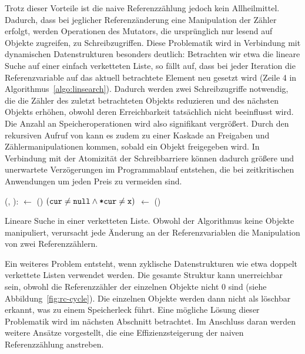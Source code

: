 Trotz dieser Vorteile ist die naive Referenzzählung jedoch kein Allheilmittel.
Dadurch, dass bei jeglicher Referenzänderung eine Manipulation der Zähler erfolgt, werden Operationen des Mutators, die ursprünglich nur lesend auf Objekte zugreifen, zu Schreibzugriffen.
Diese Problematik wird in Verbindung mit dynamischen Datenstrukturen besonders deutlich:
Betrachten wir etwa die lineare Suche auf einer einfach verketteten Liste, so fällt auf, dass bei jeder Iteration die Referenzvariable auf das aktuell betrachtete Element neu gesetzt wird (Zeile 4 in Algorithmus~\ref{algo:linsearch}).
Dadurch werden zwei Schreibzugriffe notwendig, die die Zähler des zuletzt betrachteten Objekts reduzieren und des nächsten Objekts erhöhen, obwohl deren Erreichbarkeit tatsächlich nicht beeinflusst wird.
Die Anzahl an Speicheroperationen wird also signifikant vergrößert.
Durch den rekursiven Aufruf von  kann es zudem zu einer Kaskade an Freigaben und Zählermanipulationen kommen, sobald ein Objekt freigegeben wird.
In Verbindung mit der Atomizität der Schreibbarriere können dadurch größere und unerwartete Verzögerungen im Programmablauf entstehen, die bei zeitkritischen Anwendungen um jeden Preis zu vermeiden sind.


\begin{algorithm}[h]
\begin{algorithmic}[1]
	\State {}(, ):
	\State \quad {} $\gets$ ()
	\State \quad \WHILE $(\texttt{cur} \neq \texttt{null} \wedge \texttt{*cur} \neq \texttt{x})$
	\State \quad \quad {} $\gets$ ()
	\State \quad \Return {} 
\end{algorithmic}
\caption[Lineare Suche]{Lineare Suche in einer verketteten Liste. Obwohl der Algorithmus keine Objekte manipuliert, verursacht jede Änderung an der Referenzvariablen  die Manipulation von zwei Referenzzählern.}
\label{algo:linsearch}
\end{algorithm}

Ein weiteres Problem entsteht, wenn zyklische Datenstrukturen wie etwa doppelt verkettete Listen verwendet werden.
Die gesamte Struktur kann unerreichbar sein, obwohl die Referenzzähler der einzelnen Objekte nicht $0$ sind (siehe Abbildung~\ref{fig:rc-cycle}).
Die einzelnen Objekte werden dann nicht als löschbar erkannt, was zu einem Speicherleck führt.
Eine mögliche Lösung dieser Problematik wird im nächsten Abschnitt betrachtet.
Im Anschluss daran werden weitere Ansätze vorgestellt, die eine Effizienzsteigerung der naiven Referenzzählung anstreben. 

